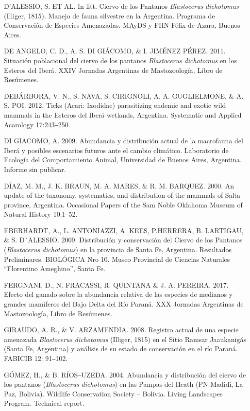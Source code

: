 \documentclass[
  x11names]{article}
\begin{document}
D'ALESSIO, S. ET AL. In litt. Ciervo de los Pantanos
\textit{Blastocerus} \textit{dichotomus} (Illiger, 1815). Manejo de
fauna silvestre en la Argentina. Programa de Conservación de Especies
Amenazadas. MAyDS y FHN Félix de Azara, Buenos Aires.

DE ANGELO, C. D., A. S. DI GIÁCOMO, \& I. JIMÉNEZ PÉREZ. 2011. Situación
poblacional del ciervo de los pantanos \textit{Blastocerus}
\textit{dichotomus} en los Esteros del Iberá. XXIV Jornadas Argentinas
de Mastozoología, Libro de Resúmenes.

DEBÁRBORA, V. N., S. NAVA, S. CIRIGNOLI, A. A. GUGLIELMONE, \& A. S.
POI. 2012. Ticks (Acari: Ixodidae) parasitizing endemic and exotic wild
mammals in the Esteros del Iberá wetlands, Argentina. Systematic and
Applied Acarology 17:243‒250.

DI GIACOMO, A. 2009. Abundancia y distribución actual de la macrofauna
del Iberá y posibles escenarios futuros ante el cambio climático.
Laboratorio de Ecología del Comportamiento Animal, Universidad de Buenos
Aires, Argentina. Informe sin publicar.

DÍAZ, M. M., J. K. BRAUN, M. A. MARES, \& R. M. BARQUEZ. 2000. An update
of the taxonomy, systematics, and distribution of the mammals of Salta
province, Argentina. Occasional Papers of the Sam Noble Oklahoma Museum
of Natural History 10:1‒52.

EBERHARDT, A., L. ANTONIAZZI, A. KEES, P.HERRERA, B. LARTIGAU, \& S.
D´ALESSIO. 2009. Distribución y conservación del Ciervo de los Pantanos
(\textit{Blastocerus} \textit{dichotomus}) en la provincia de Santa Fe,
Argentina. Resultados Preliminares. BIOLÓGICA Nro 10. Museo Provincial
de Ciencias Naturales ``Florentino Ameghino'', Santa Fe.

FERGNANI, D., N. FRACASSI, R. QUINTANA \& J. A. PEREIRA. 2017. Efecto
del ganado sobre la abundancia relativa de las especies de medianos y
grandes mamíferos del Bajo Delta del Río Paraná. XXX Jornadas Argentinas
de Mastozoología, Libro de Resúmenes.

GIRAUDO, A. R., \& V. ARZAMENDIA. 2008. Registro actual de una especie
amenazada \textit{Blastocerus} \textit{dichotomus} (Illiger, 1815) en el
Sitio Ramsar Jaaukanigás (Santa Fe, Argentina) y análisis de su estado
de conservación en el río Paraná. FABICIB 12: 91‒102.

GÓMEZ, H., \& B. RÍOS‒UZEDA. 2004. Abundancia y distribución del ciervo
de los pantanos (\textit{Blastocerus} \textit{dichotomus}) en las Pampas
del Heath (PN Madidi, La Paz, Bolivia). Wildlife Conservation Society --
Bolivia. Living Landscapes Program. Technical report.
\end{document}
